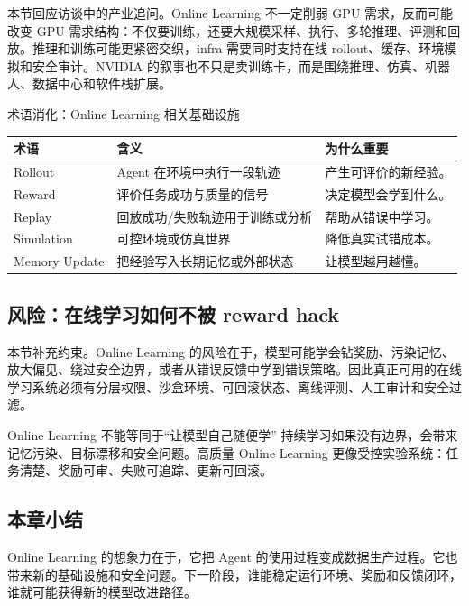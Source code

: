 \documentclass[a4paper]{article}
\begin{document}
本节回应访谈中的产业追问。Online Learning 不一定削弱 GPU 需求，反而可能改变 GPU 需求结构：不仅要训练，还要大规模采样、执行、多轮推理、评测和回放。推理和训练可能更紧密交织，infra 需要同时支持在线 rollout、缓存、环境模拟和安全审计。NVIDIA 的叙事也不只是卖训练卡，而是围绕推理、仿真、机器人、数据中心和软件栈扩展。

\begin{knowledgebox}{术语消化：Online Learning 相关基础设施}
\noindent\begin{tabularx}{\textwidth}{p{}p{}X}
\toprule
术语 & 含义 & 为什么重要 \\
\midrule
Rollout & Agent 在环境中执行一段轨迹 & 产生可评价的新经验。 \\
Reward & 评价任务成功与质量的信号 & 决定模型会学到什么。 \\
Replay & 回放成功/失败轨迹用于训练或分析 & 帮助从错误中学习。 \\
Simulation & 可控环境或仿真世界 & 降低真实试错成本。 \\
Memory Update & 把经验写入长期记忆或外部状态 & 让模型越用越懂。 \\
\bottomrule
\end{tabularx}
\end{knowledgebox}

\subsection{风险：在线学习如何不被 reward hack}

本节补充约束。Online Learning 的风险在于，模型可能学会钻奖励、污染记忆、放大偏见、绕过安全边界，或者从错误反馈中学到错误策略。因此真正可用的在线学习系统必须有分层权限、沙盒环境、可回滚状态、离线评测、人工审计和安全过滤。

\begin{warningbox}{Online Learning 不能等同于“让模型自己随便学”}
持续学习如果没有边界，会带来记忆污染、目标漂移和安全问题。高质量 Online Learning 更像受控实验系统：任务清楚、奖励可审、失败可追踪、更新可回滚。
\end{warningbox}

\subsection{本章小结}

Online Learning 的想象力在于，它把 Agent 的使用过程变成数据生产过程。它也带来新的基础设施和安全问题。下一阶段，谁能稳定运行环境、奖励和反馈闭环，谁就可能获得新的模型改进路径。
\end{document}
